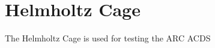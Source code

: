 

\chapter{Helmholtz Cage}

\label{ch:BG}

The Helmholtz Cage is used for testing the \ac{ARC} \ac{ACDS}
